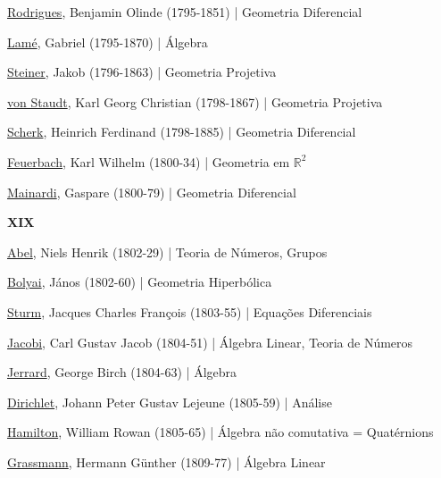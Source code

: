 \documentclass[12pt,a4paper]{article}
\begin{document}
			\href{http://en.wikipedia.org/wiki/Olinde_Rodrigues}{Rodrigues}, Benjamin Olinde (1795-1851) | Geometria Diferencial

			\href{http://pt.wikipedia.org/wiki/Gabriel_Lam\%C3\%A9}{Lam\'e}, Gabriel (1795-1870) | \'Algebra

			\href{http://en.wikipedia.org/wiki/Jakob_Steiner}{Steiner}, Jakob (1796-1863) | Geometria Projetiva

			\href{http://en.wikipedia.org/wiki/Von_Staudt}{von Staudt}, Karl Georg Christian (1798-1867) | Geometria Projetiva

			\href{http://en.wikipedia.org/wiki/Heinrich_Scherk}{Scherk}, Heinrich Ferdinand (1798-1885) | Geometria Diferencial

			\href{http://en.wikipedia.org/wiki/Karl_Wilhelm_Feuerbach}{Feuerbach}, Karl Wilhelm (1800-34) | Geometria em $ \mathbb{R}^2 $

			\href{http://en.wikipedia.org/wiki/Gaspare_Mainardi}{Mainardi}, Gaspare (1800-79) | Geometria Diferencial

			\begin{flushright}
			\end{flushright}

			\textbf{XIX}

			\href{http://pt.wikipedia.org/wiki/Niels_Henrik_Abel}{Abel}, Niels Henrik (1802-29) | Teoria de N\'umeros, Grupos

			\href{http://pt.wikipedia.org/wiki/J\%C3\%A1nos_Bolyai}{Bolyai}, J\'anos (1802-60) | Geometria Hiperb\'olica

			\href{http://en.wikipedia.org/wiki/Jacques_Charles_Fran\%C3\%A7ois_Sturm}{Sturm}, Jacques Charles Fran\c{c}ois (1803-55) | Equa\c{c}\~oes Diferenciais

			\href{http://pt.wikipedia.org/wiki/Carl_Gustav_Jakob_Jacobi}{Jacobi}, Carl Gustav Jacob (1804-51) | \'Algebra Linear, Teoria de N\'umeros

			\href{http://en.wikipedia.org/wiki/George_Jerrard}{Jerrard}, George Birch (1804-63) | \'Algebra

			\href{http://pt.wikipedia.org/wiki/Dirichlet}{Dirichlet}, Johann Peter Gustav Lejeune (1805-59) | An\'alise

			\href{http://pt.wikipedia.org/wiki/William_Rowan_Hamilton}{Hamilton}, William Rowan (1805-65) | \'Algebra n\~ao comutativa = Quat\'ernions

			\href{http://en.wikipedia.org/wiki/Hermann_Grassmann}{Grassmann}, Hermann Günther (1809-77) | \'Algebra Linear
\end{document}
